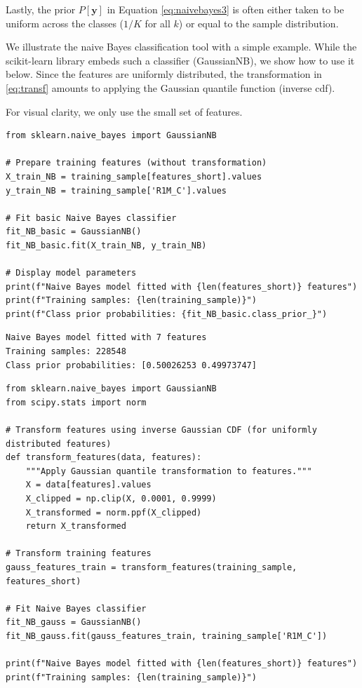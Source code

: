 Lastly, the prior $P[\textbf{y}]$ in Equation \ref{eq:naivebayes3} is often either taken to be uniform across the classes ($1/K$ for all $k$) or equal to the sample distribution.

We illustrate the naive Bayes classification tool with a simple example. While the scikit-learn library embeds such a classifier (GaussianNB), we show how to use it below. Since the features are uniformly distributed, the transformation in \ref{eq:transf} amounts to applying the Gaussian quantile function (inverse cdf).

For visual clarity, we only use the small set of features.

\begin{verbatim}
from sklearn.naive_bayes import GaussianNB

# Prepare training features (without transformation)
X_train_NB = training_sample[features_short].values
y_train_NB = training_sample['R1M_C'].values

# Fit basic Naive Bayes classifier
fit_NB_basic = GaussianNB()
fit_NB_basic.fit(X_train_NB, y_train_NB)

# Display model parameters
print(f"Naive Bayes model fitted with {len(features_short)} features")
print(f"Training samples: {len(training_sample)}")
print(f"Class prior probabilities: {fit_NB_basic.class_prior_}")
\end{verbatim}

\begin{verbatim}
Naive Bayes model fitted with 7 features
Training samples: 228548
Class prior probabilities: [0.50026253 0.49973747]
\end{verbatim}

\begin{verbatim}
from sklearn.naive_bayes import GaussianNB
from scipy.stats import norm

# Transform features using inverse Gaussian CDF (for uniformly distributed features)
def transform_features(data, features):
    """Apply Gaussian quantile transformation to features."""
    X = data[features].values
    X_clipped = np.clip(X, 0.0001, 0.9999)
    X_transformed = norm.ppf(X_clipped)
    return X_transformed

# Transform training features
gauss_features_train = transform_features(training_sample, features_short)

# Fit Naive Bayes classifier
fit_NB_gauss = GaussianNB()
fit_NB_gauss.fit(gauss_features_train, training_sample['R1M_C'])

print(f"Naive Bayes model fitted with {len(features_short)} features")
print(f"Training samples: {len(training_sample)}")
\end{verbatim}


